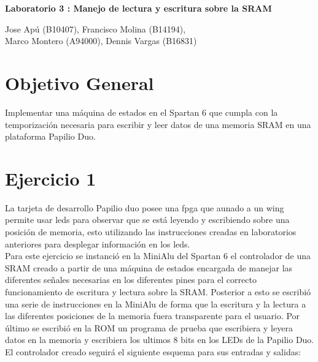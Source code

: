 \documentclass[10pt]{article}
\begin{document}
\begin{huge}
\begin{center}
\textbf{Laboratorio 3 : Manejo de lectura y escritura sobre la SRAM}
\end{center}
\end{huge}

\begin{Large}
\begin{center}
Jose Apú (B10407), Francisco Molina (B14194), \\Marco Montero (A94000), Dennis Vargas (B16831)
\end{center}
\end{Large}

\section*{Objetivo General}

Implementar una máquina de estados en el Spartan 6 que cumpla con la temporización necesaria para escribir y leer datos de una memoria SRAM en una plataforma Papilio Duo.\\[0.3 cm]


\section*{Ejercicio 1}
La tarjeta de desarrollo Papilio duo posee una fpga que aunado a un wing permite usar leds para observar que se está leyendo y escribiendo sobre una posición de memoria, esto utilizando las instrucciones creadas en laboratorios anteriores para desplegar información en los leds.\\

Para este ejercicio se instanció en la MiniAlu del Spartan 6 el controlador de una SRAM creado a partir de una máquina de estados encargada de manejar las diferentes señales necesarias en los diferentes pines para el correcto funcionamiento de escritura y lectura sobre la SRAM. Posterior a esto se escribió una serie de instrucciones en la MiniAlu de forma que la escritura y la lectura a las diferentes posiciones de la memoria fuera transparente para el usuario. Por último se escribió en la ROM un programa de prueba que escribiera y leyera datos en la memoria y escribiera los ultimos 8 bits en los LEDs de la Papilio Duo.  \\

El controlador creado seguirá el siguiente esquema para sus entradas y salidas:
\end{document}
